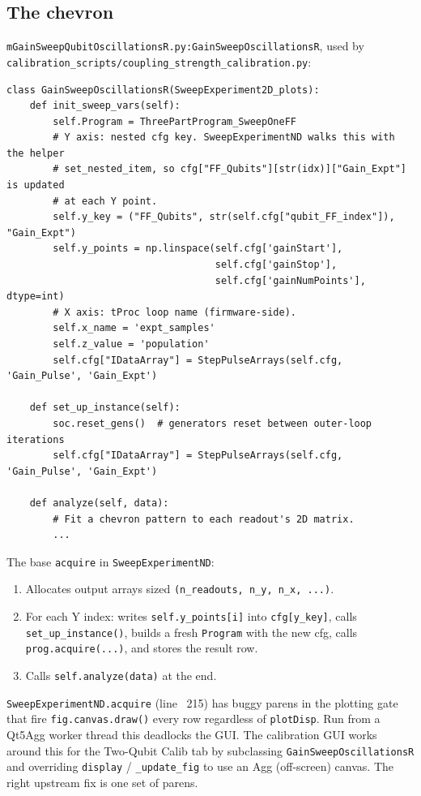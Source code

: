 \documentclass[11pt,letterpaper]{article}
\begin{document}
\subsection{The chevron}
\texttt{mGainSweepQubitOscillationsR.py:GainSweepOscillationsR}, used by \texttt{calibration\_scripts/coupling\_strength\_calibration.py}:
\begin{lstlisting}
class GainSweepOscillationsR(SweepExperiment2D_plots):
    def init_sweep_vars(self):
        self.Program = ThreePartProgram_SweepOneFF
        # Y axis: nested cfg key. SweepExperimentND walks this with the helper
        # set_nested_item, so cfg["FF_Qubits"][str(idx)]["Gain_Expt"] is updated
        # at each Y point.
        self.y_key = ("FF_Qubits", str(self.cfg["qubit_FF_index"]), "Gain_Expt")
        self.y_points = np.linspace(self.cfg['gainStart'],
                                    self.cfg['gainStop'],
                                    self.cfg['gainNumPoints'], dtype=int)
        # X axis: tProc loop name (firmware-side).
        self.x_name = 'expt_samples'
        self.z_value = 'population'
        self.cfg["IDataArray"] = StepPulseArrays(self.cfg, 'Gain_Pulse', 'Gain_Expt')

    def set_up_instance(self):
        soc.reset_gens()  # generators reset between outer-loop iterations
        self.cfg["IDataArray"] = StepPulseArrays(self.cfg, 'Gain_Pulse', 'Gain_Expt')

    def analyze(self, data):
        # Fit a chevron pattern to each readout's 2D matrix.
        ...
\end{lstlisting}
The base \texttt{acquire} in \texttt{SweepExperimentND}:
\begin{enumerate}[leftmargin=*]
  \item Allocates output arrays sized \texttt{(n\_readouts, n\_y, n\_x, ...)}.
  \item For each Y index: writes \texttt{self.y\_points[i]} into \texttt{cfg[y\_key]}, calls \texttt{set\_up\_instance()}, builds a fresh \texttt{Program} with the new cfg, calls \texttt{prog.acquire(...)}, and stores the result row.
  \item Calls \texttt{self.analyze(data)} at the end.
\end{enumerate}

\begin{pitfall}
\texttt{SweepExperimentND.acquire} (line ~215) has buggy parens in the plotting gate that fire \texttt{fig.canvas.draw()} every row regardless of \texttt{plotDisp}. Run from a Qt5Agg worker thread this deadlocks the GUI. The calibration GUI works around this for the Two-Qubit Calib tab by subclassing \texttt{GainSweepOscillationsR} and overriding \texttt{display} / \texttt{\_update\_fig} to use an Agg (off-screen) canvas. The right upstream fix is one set of parens.
\end{pitfall}
\end{document}
